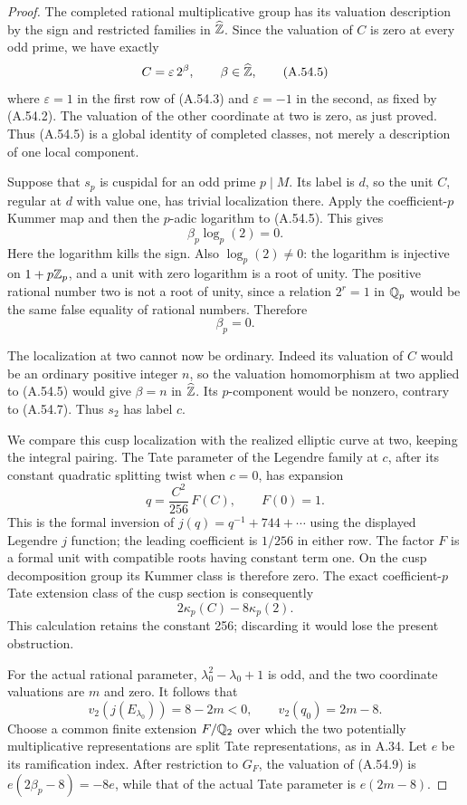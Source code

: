 \begin{proof}
The completed rational multiplicative group has its valuation
description by the sign and restricted families in
$\widehat{\mathbb Z}$.  Since the valuation of $C$ is zero at every odd
prime, we have exactly
\[
                    C=\varepsilon\,2^\beta,
       \qquad \beta\in\widehat{\mathbb Z},
\tag{A.54.5}
\]
where $\varepsilon=1$ in the first row of (A.54.3) and
$\varepsilon=-1$ in the second, as fixed by (A.54.2).
The valuation of the other coordinate at two is zero, as
just proved.  Thus (A.54.5) is a global identity of completed
classes, not merely a description of one local component.

Suppose that $s_p$ is cuspidal for an odd prime $p\mid M$.
Its label is $d$, so the unit $C$, regular at $d$ with value
one, has trivial localization there.  Apply the coefficient-$p$
Kummer map and then the $p$-adic logarithm to (A.54.5).  This gives
\[
                      \beta_p\log_p(2)=0.
\tag{A.54.6}
\]
Here the logarithm kills the sign.  Also $\log_p(2)\ne0$:
the logarithm is injective on $1+p\mathbb Z_p$, and a unit with zero
logarithm is a root of unity.  The positive rational number two
is not a root of unity, since a relation $2^r=1$ in $\mathbb Q_p$
would be the same false equality of rational numbers.
Therefore
\[
                              \beta_p=0.
\tag{A.54.7}
\]

The localization at two cannot now be ordinary.  Indeed its
valuation of $C$ would be an ordinary positive integer $n$, so
the valuation homomorphism at two applied to (A.54.5) would
give $\beta=n$ in $\widehat{\mathbb Z}$.  Its $p$-component would be
nonzero, contrary to (A.54.7).  Thus $s_2$ has label $c$.

We compare this cusp localization with the realized elliptic
curve at two, keeping the integral pairing.  The Tate parameter
of the Legendre family at $c$, after its constant quadratic
splitting twist when $c=0$, has expansion
\[
                  q=\frac{C^2}{256}\,F(C),
                       \qquad F(0)=1.
\tag{A.54.8}
\]
This is the formal inversion of
$j(q)=q^{-1}+744+\cdots$ using the displayed Legendre $j$
function; the leading coefficient is $1/256$ in either row.
The factor $F$ is a formal unit with compatible roots having
constant term one.  On the cusp decomposition group its
Kummer class is therefore zero.  The exact coefficient-$p$
Tate extension class of the cusp section is consequently
\[
                     2\kappa_p(C)-8\kappa_p(2).
\tag{A.54.9}
\]
This calculation retains the constant 256; discarding it would
lose the present obstruction.

For the actual rational parameter, $\lambda_0^2-\lambda_0+1$
is odd, and the two coordinate valuations are $m$ and zero.
It follows that
\[
             v_2(j(E_{\lambda_0}))=8-2m<0,
                 \qquad v_2(q_0)=2m-8.
\tag{A.54.10}
\]
Choose a common finite extension $F/\mathbb Q_2$ over which the two
potentially multiplicative representations are split Tate
representations, as in A.34.  Let $e$ be its ramification index.
After restriction to $G_F$, the valuation of (A.54.9) is
$e(2\beta_p-8)=-8e$, while that of the actual Tate parameter
is $e(2m-8)$.


\end{proof}
